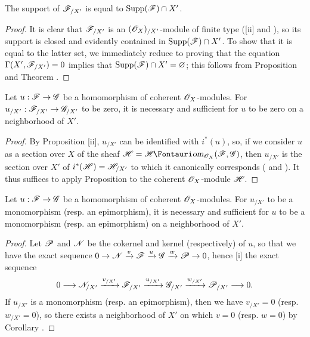 \begin{corollary}[10.8.12]
\label{I.10.8.12}
The support of $\mathscr{F}_{/X'}$ is equal to $\operatorname{Supp}(\mathscr{F})\cap X'$.
\end{corollary}

\begin{proof}
It is clear that $\mathscr{F}_{/X'}$ is an $(\mathscr{O}_X)_{/X'}$-module of finite type ([ii] and ),
so its support is closed  and evidently contained in $\operatorname{Supp}(\mathscr{F})\cap X'$.
To show that it is equal to the latter set, we immediately reduce to proving that the equation $\Gamma(X',\mathscr{F}_{/X'})=0$ implies that $\operatorname{Supp}(\mathscr{F})\cap X'=\varnothing$; this follows from Proposition  and Theorem .
\end{proof}

\begin{corollary}[10.8.13]
\label{I.10.8.13}
Let $u:\sh{F}\to\sh{G}$ be a homomorphism of coherent $\mathscr{O}_X$-modules.
For $u_{/X'}:\sh{F}_{/X'}\to\sh{G}_{/X'}$ to be zero, it is necessary and sufficient for $u$ to be zero on a neighborhood of $X'$.
\end{corollary}

\begin{proof}
By Proposition [ii], $u_{/X'}$ can be identified with $i^*(u)$, so, if we consider $u$ as a section over $X$ of the sheaf $\sh{H}=\shHom_{\sh{O}_X}(\sh{F},\sh{G})$, then $u_{/X'}$ is the section over $X'$ of $i^*(\mathscr{H})=\mathscr{H}_{/X'}$ to which it canonically corresponds ( and ).
It thus suffices to apply Proposition  to the coherent $\mathscr{O}_X$-module $\mathscr{H}$.
\end{proof}

\begin{corollary}[10.8.14]
\label{I.10.8.14}
Let $u:\sh{F}\to\sh{G}$ be a homomorphism of coherent $\mathscr{O}_X$-modules.
For $u_{/X'}$ to be a monomorphism (resp. an epimorphism), it is necessary and sufficient for $u$ to be a monomorphism (resp. an epimorphism) on a neighborhood of $X'$.
\end{corollary}

\begin{proof}
Let $\mathscr{P}$ and $\mathscr{N}$ be the cokernel and kernel (respectively) of $u$, so that we have the exact sequence $0\to\sh{N}\xrightarrow{v}\sh{F}\xrightarrow{u}\sh{G}\xrightarrow{w}\sh{P}\to 0$, hence [i] the exact sequence
\[
  0\to\sh{N}_{/X'}\xrightarrow{v_{/X'}}\sh{F}_{/X'}\xrightarrow{u_{/X'}}\sh{G}_{/X'}\xrightarrow{w_{/X'}}\sh{P}_{/X'}\to 0.
\]
If $u_{/X'}$ is a monomorphism (resp. an epimorphism), then we have $v_{/X'}=0$ (resp. $w_{/X'}=0$), so there exists a neighborhood of $X'$ on which $v=0$ (resp. $w=0$) by Corollary .
\end{proof}

